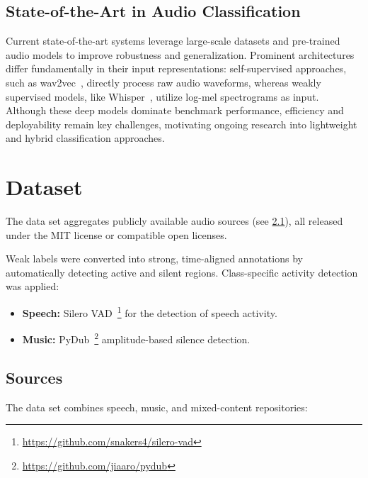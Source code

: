 \section{State-of-the-Art in Audio Classification}
\label{sec:theory_sota}
Current state-of-the-art systems leverage large-scale datasets and pre-trained audio models to improve robustness and generalization.
Prominent architectures differ fundamentally in their input representations: self-supervised approaches, such as wav2vec~\cite {baevski2020wav2vec20frameworkselfsupervised}, directly process raw audio waveforms, whereas weakly supervised models, like Whisper~\cite{radford2022robustspeechrecognitionlargescale}, utilize log-mel spectrograms as input.
Although these deep models dominate benchmark performance, efficiency and deployability remain key challenges, motivating ongoing research into lightweight and hybrid classification approaches.


\chapter{Dataset}
\label{cap:dataset}

The data set aggregates publicly available audio sources (see \cref{sec:dataset_sources}), all released under the MIT license or compatible open licenses.

Weak labels were converted into strong, time-aligned annotations by automatically detecting active and silent regions. Class-specific activity detection was applied:

\begin{itemize}
    \item \textbf{Speech:} Silero VAD~\footnote{\url{https://github.com/snakers4/silero-vad}} for the detection of speech activity.
    \item \textbf{Music:} PyDub~\footnote{\url{https://github.com/jiaaro/pydub}} amplitude-based silence detection.
\end{itemize}

\section{Sources}
\label{sec:dataset_sources}
The data set combines speech, music, and mixed-content repositories:

